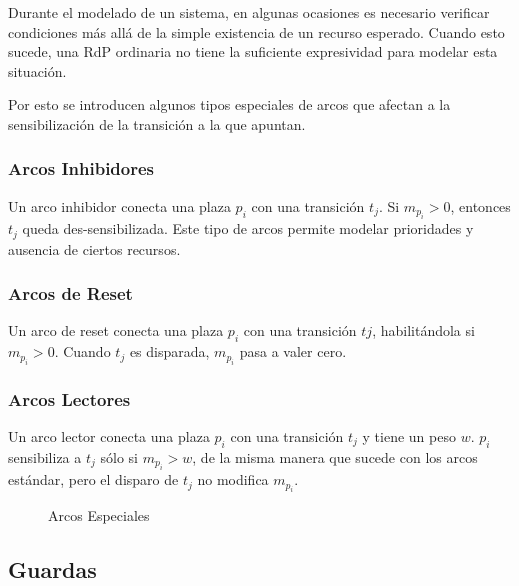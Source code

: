 Durante el modelado de un sistema, en algunas ocasiones es necesario verificar
condiciones más allá de la simple existencia de un recurso esperado.
Cuando esto sucede, una RdP ordinaria no tiene la suficiente expresividad para
modelar esta situación.

Por esto se introducen algunos tipos especiales de arcos que afectan a la
sensibilización de la transición a la que apuntan.

\subsubsection{Arcos Inhibidores}

Un arco inhibidor conecta una plaza $p_{i}$ con una transición $t_{j}$. Si
$m_{p_i} > 0$, entonces $t_{j}$ queda des-sensibilizada.
Este tipo de arcos permite modelar prioridades y ausencia de ciertos recursos.

\subsubsection{Arcos de Reset}

Un arco de reset conecta una plaza $p_{i}$ con una transición $t{j}$,
habilitándola si $m_{p_{i}} > 0$.
Cuando $t_{j}$ es disparada, $m_{p_{i}}$ pasa a valer cero.

\subsubsection{Arcos Lectores}

Un arco lector conecta una plaza $p_{i}$ con una transición $t_{j}$ y tiene un
peso $w$.
$p_{i}$ sensibiliza a $t_{j}$ sólo si $m_{p_{i}} > w$, de la misma manera que
sucede con los arcos estándar, pero el disparo de $t_{j}$ no modifica
$m_{p_{i}}$.

\begin{figure}[h]
  \centering
  \caption{Arcos Especiales}
  \label{fig:arcos_especiales}
\end{figure}

\subsection{Guardas}


